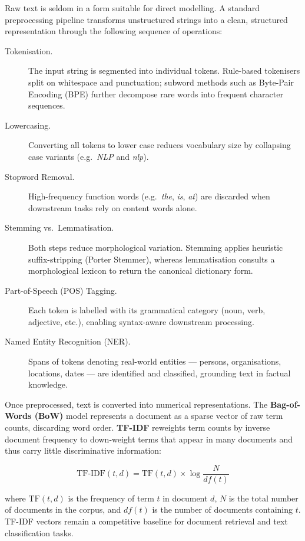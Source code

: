 \documentclass[12pt, a4paper]{article}
\begin{document}
Raw text is seldom in a form suitable for direct modelling. A standard
preprocessing pipeline transforms unstructured strings into a clean, structured
representation through the following sequence of operations:

\begin{description}
  \item[Tokenisation.] The input string is segmented into individual tokens.
    Rule-based tokenisers split on whitespace and punctuation; subword methods
    such as Byte-Pair Encoding (BPE) further decompose rare words into
    frequent character sequences.
  \item[Lowercasing.] Converting all tokens to lower case reduces vocabulary
    size by collapsing case variants (e.g.\ \textit{NLP} and \textit{nlp}).
  \item[Stopword Removal.] High-frequency function words (e.g.\ \textit{the},
    \textit{is}, \textit{at}) are discarded when downstream tasks rely on
    content words alone.
  \item[Stemming vs.\ Lemmatisation.] Both steps reduce morphological variation.
    Stemming applies heuristic suffix-stripping (Porter Stemmer), whereas
    lemmatisation consults a morphological lexicon to return the canonical
    dictionary form.
  \item[Part-of-Speech (POS) Tagging.] Each token is labelled with its
    grammatical category (noun, verb, adjective, etc.), enabling syntax-aware
    downstream processing.
  \item[Named Entity Recognition (NER).] Spans of tokens denoting real-world
    entities --- persons, organisations, locations, dates --- are identified and
    classified, grounding text in factual knowledge.
\end{description}

Once preprocessed, text is converted into numerical representations. The
\textbf{Bag-of-Words (BoW)} model represents a document as a sparse vector of
raw term counts, discarding word order. \textbf{TF-IDF} reweights term counts
by inverse document frequency to down-weight terms that appear in many documents
and thus carry little discriminative information:

\[
  \text{TF-IDF}(t,d) = \text{TF}(t,d) \times \log\frac{N}{df(t)}
\]

\noindent where $\text{TF}(t,d)$ is the frequency of term $t$ in document $d$,
$N$ is the total number of documents in the corpus, and $df(t)$ is the number
of documents containing $t$. TF-IDF vectors remain a competitive baseline for
document retrieval and text classification tasks.
\end{document}
